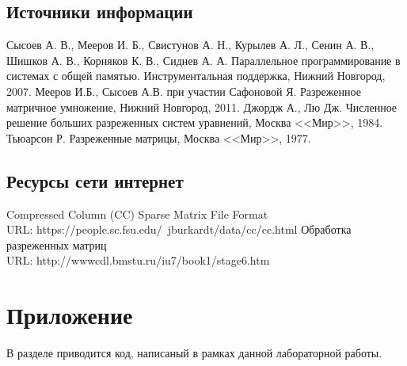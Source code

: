 \documentclass{report}
\begin{document}
\newpage

\begin{thebibliography}{1}
\subsection*{Источники информации}
Сысоев А. В., Мееров И. Б., Свистунов А. Н., Курылев А. Л., Сенин А. В., Шишков А. В., Корняков К. В.,
Сиднев А. А. Параллельное программирование в системах с общей
памятью. Инструментальная поддержка, Нижний Новгород, 2007.
Мееров И.Б., Сысоев А.В. при участии Сафоновой Я. Разреженное матричное умножение, Нижний Новгород, 2011.
Джордж А., Лю Дж. Численное решение больших разреженных систем
уравнений, Москва <<Мир>>, 1984.
Тьюарсон Р. Разреженные матрицы, Москва <<Мир>>, 1977.
\subsection*{Ресурсы сети интернет}
Compressed Column (CC) Sparse Matrix File Format \\
URL: https://people.sc.fsu.edu/~jburkardt/data/cc/cc.html
Обработка разреженных матриц \\
URL: http://wwwcdl.bmstu.ru/iu7/book1/stage6.htm
\end{thebibliography}

\newpage

\section*{Приложение}
В разделе приводится код, написаный в рамках данной лабораторной работы.
\end{document}
